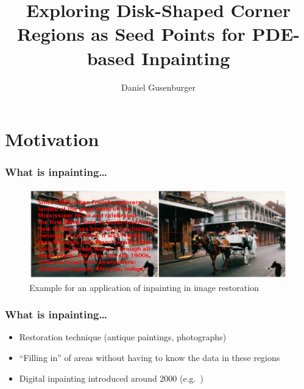 \documentclass{beamer}
\title[Corner Region Inpainting]{Exploring Disk-Shaped Corner Regions as Seed Points for PDE-based Inpainting}
\author{Daniel Gusenburger}
\begin{document}
\begin{frame}[t]
        \titlepage
\end{frame}


    \section{Motivation}
    \begin{frame}[t]
        \frametitle{What is inpainting\dots}
        \begin{figure}
            \centering
            \includegraphics[width=\linewidth]{../thesis/Images/inpainting_bertalmio.png}
            \caption{Example for an application of inpainting in image
            restoration~\cite{bertalmio00}}
        \end{figure}
    \end{frame}

    \begin{frame}[t]
        \frametitle{What is inpainting\dots}
        \begin{itemize}[<+-|alert@+>]
            \item Restoration technique (antique paintings, photographs)
            \item ``Filling in'' of areas without having to know the data in these regions
            \item Digital inpainting introduced around 2000 (e.g.~\cite{bertalmio00, masnou98}) 
        \end{itemize}
    \end{frame}
\end{document}
